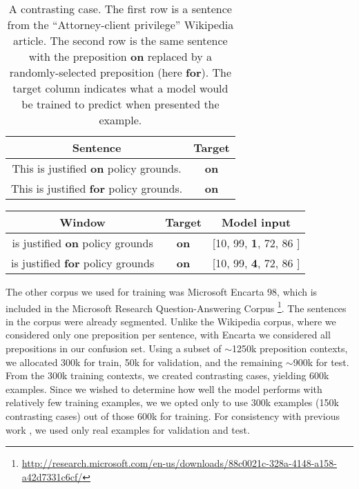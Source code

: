 \begin{table}[H]
\begin{tabular}{cc}
\textbf{Sentence} & \textbf{Target} \\
\toprule
This is justified \textbf{on} policy grounds. & \textbf{on} \\
This is justified \textbf{for} policy grounds. & \textbf{on} \\
\bottomrule
\end{tabular}
\caption{A contrasting case.  The first row is a sentence from the ``Attorney-client privilege'' Wikipedia article.   The second row is the same sentence with the preposition \textbf{on} replaced by a randomly-selected preposition (here \textbf{for}).  The target column indicates what a model would be trained to predict when presented the example.} 
\label{tab:Contrasting}
\end{table}

\begin{table*}
\centering
\begin{tabular}{ccc}
\textbf{Window} & \textbf{Target} & \textbf{Model input} \\
\toprule
is justified \textbf{on} policy grounds & \textbf{on} & [10, 99, \textbf{1}, 72, 86 ] \\
is justified \textbf{for} policy grounds & \textbf{on} & [10, 99, \textbf{4}, 72, 86 ] \\
\bottomrule
\end{tabular}
\caption{Width-5 windows of a contrasting case (cf. Table \ref{tab:Contrasting}) and corresponding model inputs, assuming that the indices of ``on'' and ``for'' in the vocabulary are 1 and 4, respectively.  The window size here is only for purposes of illustration; we consider and evaluate multiple window sizes in Section \ref{sec:PrepositionExperiments}, including the entire sentence.}
\label{tab:Windows}
\end{table*}

The other corpus we used for training was Microsoft Encarta 98, which is included in the Microsoft Research Question-Answering Corpus \footnote{\url{http://research.microsoft.com/en-us/downloads/88c0021c-328a-4148-a158-a42d7331c6cf/}}.  The sentences in the corpus were already segmented.  Unlike the Wikipedia corpus, where we considered only one preposition per sentence, with Encarta we considered all prepositions in our confusion set.  Using a subset of $\sim$1250k preposition contexts, we allocated 300k for train, 50k for validation, and the remaining $\sim$900k for test.  From the 300k training contexts, we created contrasting cases, yielding 600k examples.  Since we wished to determine how well the model performs with relatively few training examples, we we opted only to use 300k examples (150k contrasting cases) out of those 600k for training.  For consistency with previous work \cite{gamon2008using,tetreault2008native}, we used only real examples for validation and test. 

